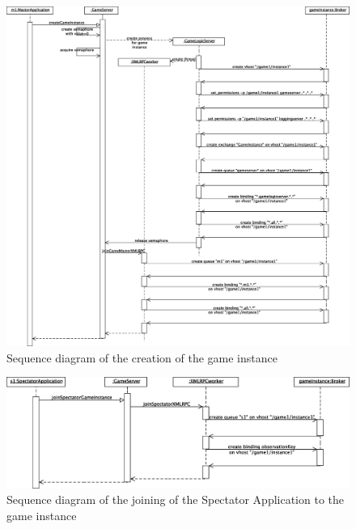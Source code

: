 \begin{figure}[htbp!]
\begin{center}
\includegraphics[scale=0.4]{Figures/_integration_sequence_game_instance_1}
\caption{Sequence diagram of the creation of the game instance}
\label{F_integration_sequence_game_instance_1}
\end{center}
\end{figure}

\begin{figure}[htbp!]
\begin{center}
\includegraphics[scale=0.4]{Figures/_integration_sequence_game_instance_2}
\caption{Sequence diagram of the joining of the \textsf{Spectator
    Application} to the game instance}
\label{F_integration_sequence_game_instance_2}
\end{center}
\end{figure}

